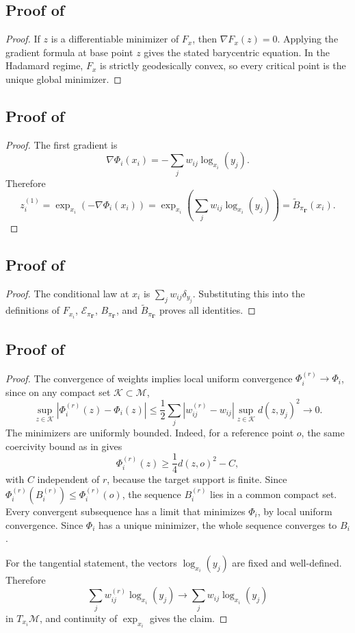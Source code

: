 \documentclass[10pt]{article} %
\theoremstyle{definition}
\providecommand{\1}{\mathbf{1}}
\providecommand{\sM}{\mathcal{M}}
\providecommand{\sK}{\mathcal{K}}
\providecommand{\mGamma}{\boldsymbol{\Gamma}}
\begin{document}
\subsection{Proof of }
\begin{proof}
If $z$ is a differentiable minimizer of $F_x$, then $\nabla F_x(z)=0$. Applying the gradient formula at base point $z$ gives the stated barycentric equation. In the Hadamard regime, $F_x$ is strictly geodesically convex, so every critical point is the unique global minimizer.
\end{proof}


\subsection{Proof of }
\begin{proof}
The first gradient is
\[
\nabla\Phi_i(x_i)=-\sum_jw_{ij}\log_{x_i}(y_j).
\]
Therefore
\[
z_i^{(1)}=\exp_{x_i}(-\nabla\Phi_i(x_i))
=\exp_{x_i}\left(\sum_jw_{ij}\log_{x_i}(y_j)\right)
=\widetilde B_{\pi_{\mGamma}}(x_i).
\]
\end{proof}

\subsection{Proof of }
\begin{proof}
The conditional law at $x_i$ is $\sum_jw_{ij}\delta_{y_j}$. Substituting this into the definitions of $F_{x_i}$, $\mathcal E_{\pi_{\mGamma}}$, $B_{\pi_{\mGamma}}$, and $\widetilde B_{\pi_{\mGamma}}$ proves all identities.
\end{proof}

\subsection{Proof of }
\begin{proof}
The convergence of weights implies local uniform convergence $\Phi_i^{(r)}\to\Phi_i$, since on any compact set $\sK\subset\sM$,
\[
\sup_{z\in\sK}|\Phi_i^{(r)}(z)-\Phi_i(z)|
\le \frac12\sum_j|w_{ij}^{(r)}-w_{ij}|\sup_{z\in\sK}d(z,y_j)^2\to0.
\]
The minimizers are uniformly bounded. Indeed, for a reference point $o$, the same coercivity bound as in  gives
\[
\Phi_i^{(r)}(z)\ge \frac14d(z,o)^2-C,
\]
with $C$ independent of $r$, because the target support is finite. Since $\Phi_i^{(r)}(B_i^{(r)})\le\Phi_i^{(r)}(o)$, the sequence $B_i^{(r)}$ lies in a common compact set. Every convergent subsequence has a limit that minimizes $\Phi_i$, by local uniform convergence. Since $\Phi_i$ has a unique minimizer, the whole sequence converges to $B_i$.

For the tangential statement, the vectors $\log_{x_i}(y_j)$ are fixed and well-defined. Therefore
\[
\sum_jw_{ij}^{(r)}\log_{x_i}(y_j)\to \sum_jw_{ij}\log_{x_i}(y_j)
\]
in $T_{x_i}\sM$, and continuity of $\exp_{x_i}$ gives the claim.
\end{proof}
\end{document}
